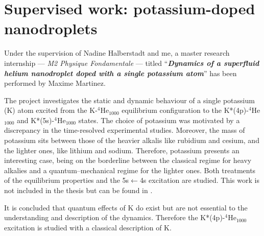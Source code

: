 	\section{Supervised work: potassium-doped nanodroplets}
		Under the supervision of Nadine Halberstadt and me, a master research internship --- \emph{M2 Physique Fondamentale} --- titled ``\emph{\textbf{Dynamics of a superfluid helium nanodroplet doped with a single potassium atom}}'' has been performed by Maxime Martinez.
	
		The project investigates the static and dynamic behaviour of a single potassium (K) atom excited from the K-$^4$He$_{1000}$ equilibrium configuration to the K*(4p)-$^4$He$_{1000}$ and K*(5s)-$^4$He$_{1000}$ states. The choice of potassium was motivated by a discrepancy in the time-resolved experimental studies\citep{Schulz2001,Reho2000-1,Reho2000-2}. Moreover, the mass of potassium sits between those of the heavier alkalis like rubidium and cesium, and the lighter ones, like lithium and sodium. Therefore, potassium presents an interesting case, being on the borderline between the classical regime for heavy alkalies and a quantum--mechanical regime for the lighter ones. Both treatments of the equilibrium properties and the 5s$\leftarrow$4s excitation are studied. This work is not included in the thesis but can be found in .
		
		It is concluded that quantum effects of K do exist but are not essential to the understanding and description of the dynamics. Therefore the K*(4p)-$^4$He$_{1000}$ excitation is studied with a classical description of K.
